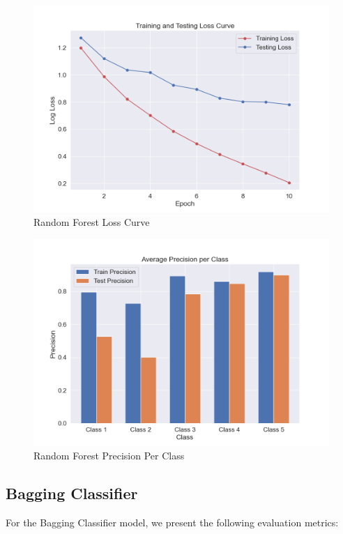 \begin{figure}[H]
	\centering
	\includegraphics[width=\textwidth]{img/paper_1/loss_curve.png}
	\caption{Random Forest Loss Curve}
\end{figure}

\begin{figure}[H]
	\centering
	\includegraphics[width=\textwidth]{img/paper_1/precision_per_class.png}
	\caption{Random Forest Precision Per Class}
\end{figure}

\subsection{Bagging Classifier}

For the Bagging Classifier model, we present the following evaluation metrics:

